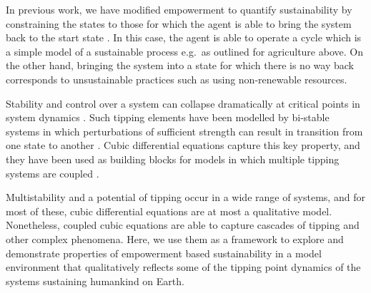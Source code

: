 \documentclass[conference]{IEEEtran}
\begin{document}




In previous work, we have modified empowerment to quantify
sustainability by constraining the states to those for which the agent
is able to bring the system back to the start state
\cite{Kim2009_sustainability}. In this case, the agent is able to
operate a cycle which is a simple model of a sustainable process e.g.\
as outlined for agriculture above. On the other hand, bringing the
system into a state for which there is no way back corresponds to
unsustainable practices such as using non-renewable resources.

Stability and control over a system can collapse dramatically at
critical points in system dynamics
\cite{Lenton2019_riskytippingpoints}. Such tipping elements have been
modelled by bi-stable systems in which perturbations of sufficient
strength can result in transition from one state to another
\cite{Lenton2008_tippingelements}. Cubic differential equations
capture this key property, and they have been used as building blocks
for models in which multiple tipping systems are coupled
\cite{Brummitt2015_coupledcatastrophes,Klose2019_interactingtippingelements}.

Multistability and a potential of tipping occur in a wide range of
systems, and for most of these, cubic differential equations are at
most a qualitative model. Nonetheless, coupled cubic equations are
able to capture cascades of tipping and other complex phenomena. Here,
we use them as a framework to explore and demonstrate properties of
empowerment based sustainability in a model environment that
qualitatively reflects some of the tipping point dynamics of the
systems sustaining humankind on Earth.


\end{document}
